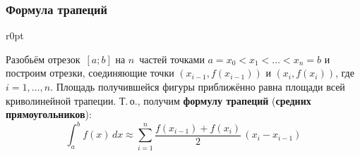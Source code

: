 \subsubsection{Формула трапеций}
\begin{wrapfigure}[6]{r}{0pt}
\noindent
{}
\end{wrapfigure}
 Разобьём отрезок~$[a; b]$ на $n$~частей точками $a = x_0 < x_1 < \ldots < x_n = b$ и построим отрезки, соединяющие точки $(x_{i-1}, f(x_{i-1}))$ и $(x_i, f(x_i))$, где $i = 1, \ldots, n$.
Площадь получившейся фигуры приближённо равна площади всей криволинейной трапеции.
Т.\,о., получим \textbf{формулу трапеций} (\textbf{средних прямоугольников}):
\begin{equation*}
\int_a^b f(x)\,dx \approx \sum_{i=1}^n \frac{f(x_{i-1}) + f(x_i)}2\,(x_i - x_{i-1})
\end{equation*}